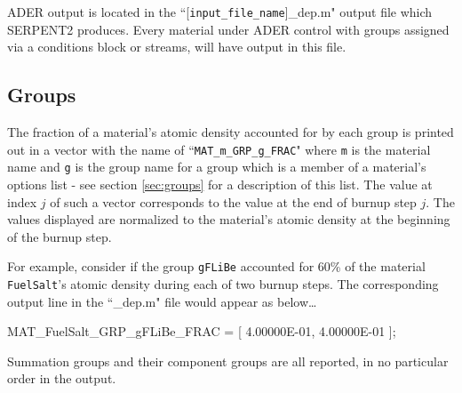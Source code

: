 ADER output is located in the ``[\texttt{input\_file\_name}]\_dep.m" output file
which SERPENT2 produces. Every material under ADER control with groups assigned
via a conditions block or streams, will have output in this file. 

\subsection{Groups}\label{ssec:output_groups}
The 
fraction of a material's atomic density accounted for by each group is printed
out in a vector with the name of ``\texttt{MAT\_m\_GRP\_g\_FRAC}" where 
\texttt{m} is the material name and \texttt{g} is the group name for a group 
which is a member of a material's options list - see section \ref{sec:groups}
for a description of this list. The value at index $j$ of such a vector
corresponds to the value at the end of burnup step $j$. The values displayed
are normalized to the material's atomic density at the beginning of the 
burnup step. 

For example, consider if the group \texttt{gFLiBe} accounted for 60\% of the
material \texttt{FuelSalt}'s atomic density during each of two burnup steps.
The corresponding output line in the ``\_dep.m" file would appear as below\ldots

\begin{li}
MAT_FuelSalt_GRP_gFLiBe_FRAC = [
4.00000E-01, 4.00000E-01 ];
\end{li} 

Summation groups and their component groups are all reported, in no particular
order in the output.

